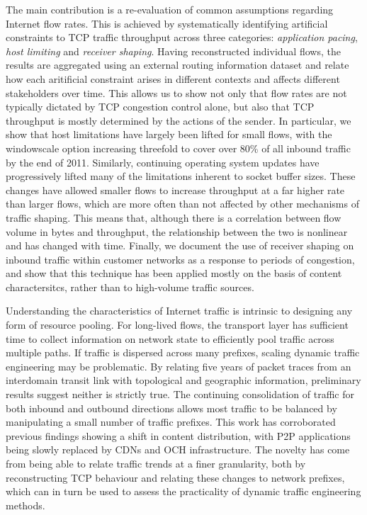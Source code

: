 The main contribution is a re-evaluation of common assumptions regarding Internet flow rates. 
This is achieved by systematically identifying artificial constraints to TCP traffic throughput across three categories: \emph{application pacing}, \emph{host limiting} and \emph{receiver shaping}. 
Having reconstructed individual flows, the results are aggregated using an external routing information dataset and relate how each aritificial constraint arises in different contexts and affects different stakeholders over time. 
This allows us to show not only that flow rates are not typically dictated by TCP congestion control alone, but also that TCP throughput is mostly determined by the actions of the sender. 
In particular, we show that host limitations have largely been lifted for small flows, with the windowscale option increasing threefold to cover over 80\% of all inbound traffic by the end of 2011. 
Similarly, continuing operating system updates have progressively lifted many of the limitations inherent to socket buffer sizes. These changes have allowed smaller flows to increase throughput at a far higher rate than larger flows, which are more often than not affected by other mechanisms of traffic shaping.
This means that, although there is a correlation between flow volume in bytes and throughput, the relationship between the two is nonlinear and has changed with time.
Finally, we document the use of receiver shaping on inbound traffic within customer networks as a response to periods of congestion, and show that this technique has been applied mostly on the basis of content charactersitcs, rather than to high-volume traffic sources. 

Understanding the characteristics of Internet traffic is intrinsic to designing any form of resource pooling.
For long-lived flows, the transport layer has sufficient time to collect information on network state to efficiently pool traffic across multiple paths.
If traffic is dispersed across many prefixes, scaling dynamic traffic engineering may be problematic.
By relating five years of packet traces from an interdomain transit link with topological and geographic information, preliminary results suggest neither is strictly true.
The continuing consolidation of traffic for both inbound and outbound directions allows most traffic to be balanced by manipulating a small number of traffic prefixes.
This work has corroborated previous findings \cite{Labovitz:2010p175} showing a shift in content distribution, with \acf{P2P} applications being slowly replaced by \acfp{CDN} and \acf{OCH} infrastructure.
The novelty has come from being able to relate traffic trends at a finer granularity, both by reconstructing \ac{TCP} behaviour and relating these changes to network prefixes, which can in turn be used to assess the practicality of dynamic traffic engineering methods.




